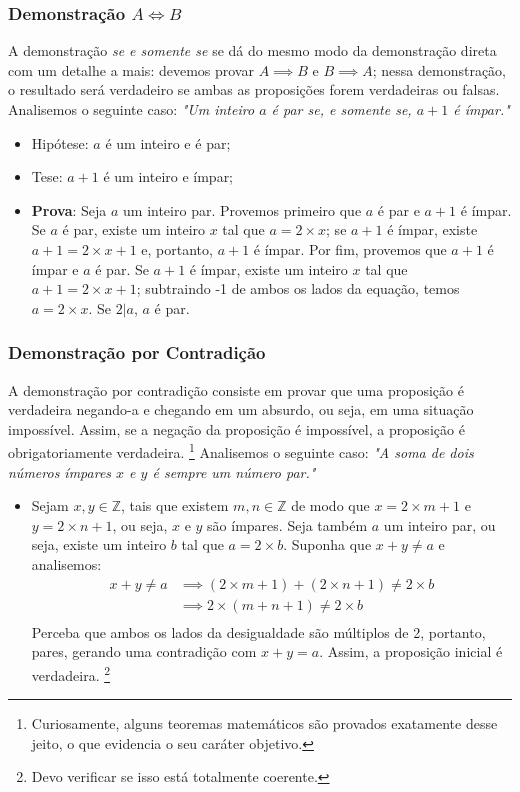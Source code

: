 \documentclass[13pt,letterpaper]{article}
\begin{document}
\subsubsection{Demonstração $A \iff B$}
A demonstração \emph{se e somente se} se dá do mesmo modo da demonstração direta com um detalhe a mais: devemos provar $A \implies B$ e $B \implies A$; nessa demonstração, o resultado será verdadeiro se ambas as proposições forem verdadeiras ou falsas.
Analisemos o seguinte caso: \emph{"Um inteiro $a$ é par se, e somente se, $a + 1$ é ímpar."}
\begin{itemize}
    \item Hipótese: $a$ é um inteiro e é par;
    \item Tese: $a + 1$ é um inteiro e ímpar;
    \item \textbf{Prova}: Seja $a$ um inteiro par. Provemos primeiro que $a$ é par e $a + 1$ é ímpar. Se $a$ é par, existe um inteiro $x$ tal que $a = 2 \times x$; se $a + 1$ é ímpar, existe $a + 1 = 2 \times x + 1$ e, portanto, $a + 1$ é ímpar.
    Por fim, provemos que $a + 1$ é ímpar e $a$ é par.
    Se $a + 1$ é ímpar, existe um inteiro $x$ tal que $a + 1 = 2 \times x + 1$; subtraindo -1 de ambos os lados da equação, temos $a = 2 \times x$. Se $2|a$, $a$ é par.
    
\end{itemize}

\subsubsection{Demonstração por Contradição}
A demonstração por contradição consiste em provar que uma proposição é verdadeira negando-a e chegando em um absurdo, ou seja, em uma situação impossível. Assim, se a negação da proposição é impossível, a proposição é obrigatoriamente verdadeira. \footnote{Curiosamente, alguns teoremas matemáticos são provados exatamente desse jeito, o que evidencia o seu caráter objetivo.}
Analisemos o seguinte caso: \emph{"A soma de dois números ímpares $x$ e $y$ é sempre um número par."}
\begin{itemize}
    \item Sejam $x, y \in \mathbb{Z}$, tais que existem $m, n \in \mathbb{Z}$ de modo que $x = 2 \times m + 1$ e $y = 2 \times n + 1$, ou seja, $x$ e $y$ são ímpares. Seja também $a$ um inteiro par, ou seja, existe um inteiro $b$ tal que $a = 2 \times b$. Suponha que $x + y \ne a$ e analisemos:
    \begin{align*}
        x + y \ne a &\implies
        (2 \times m + 1) + (2 \times n + 1) \ne 2 \times b \\ &\implies
        2 \times (m + n + 1) \ne 2 \times b \\
    \end{align*}
    Perceba que ambos os lados da desigualdade são múltiplos de 2, portanto, pares, gerando uma contradição com $x + y = a$. Assim, a proposição inicial é verdadeira. \footnote{Devo verificar se isso está totalmente coerente.}
\end{itemize}
\end{document}

